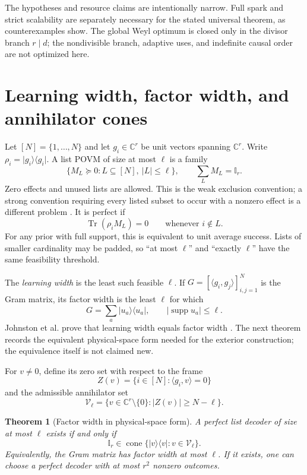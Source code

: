\documentclass[11pt,a4paper]{article}
\newtheorem{theorem}{Theorem}[section]
\newcommand{\C}{\mathbb{C}}
\newcommand{\I}{\mathbb{I}}
\newcommand{\Tr}{\operatorname{Tr}}
\newcommand{\supp}{\operatorname{supp}}
\newcommand{\cone}{\operatorname{cone}}
\newcommand{\ket}[1]{\lvert #1\rangle}
\newcommand{\bra}[1]{\langle #1\rvert}
\newcommand{\proj}[1]{\ket{#1}\!\bra{#1}}
\begin{document}
The hypotheses and resource claims are intentionally narrow.  Full spark and
strict scalability are separately necessary for the stated universal theorem, as
counterexamples show.  The global Weyl optimum is closed only in the divisor
branch $r\mid d$; the nondivisible branch, adaptive uses, and indefinite
causal order are not optimized here.

\section{Learning width, factor width, and annihilator cones}

Let $[N]=\{1,\ldots,N\}$ and let $g_i\in\C^r$ be unit vectors spanning
$\C^r$.  Write $\rho_i=\proj{g_i}$.  A list POVM of size at most $\ell$ is a
family
\[
  \{M_L\succeq0:L\subseteq[N],\ |L|\le\ell\},\qquad
  \sum_L M_L=\I_r.
\]
Zero effects and unused lists are allowed.  This is the weak exclusion
convention; a strong convention requiring every listed subset to occur with a
nonzero effect is a different problem \cite{StrattonHsiehSkrzypczyk2024}.
It is perfect if
\begin{equation}\label{eq:perfect}
  \Tr(\rho_iM_L)=0\qquad\text{whenever }i\notin L.
\end{equation}
For any prior with full support, this is equivalent to unit average success.
Lists of smaller cardinality may be padded, so ``at most $\ell$'' and
``exactly $\ell$'' have the same feasibility threshold.

The \emph{learning width} is the least such feasible $\ell$.  If
$G=[\langle g_i,g_j\rangle]_{i,j=1}^N$ is the Gram matrix, its factor width is
the least $\ell$ for which
\begin{equation}\label{eq:factorwidth}
  G=\sum_a\proj{u_a},
  \qquad |\supp u_a|\le\ell.
\end{equation}
Johnston et al. prove that learning width equals factor width
\cite{JohnstonLovitzRussoSikora2025}.  The next theorem records the equivalent
physical-space form needed for the exterior construction; the equivalence
itself is not claimed new.

For $v\ne0$, define its zero set with respect to the frame
\[
  Z(v)=\{i\in[N]:\langle g_i,v\rangle=0\}
\]
and the admissible annihilator set
\[
  \mathcal V_\ell=\{v\in\C^r\setminus\{0\}:|Z(v)|\ge N-\ell\}.
\]

\begin{theorem}[Factor width in physical-space form]\label{thm:cone}
A perfect list decoder of size at most $\ell$ exists if and only if
\begin{equation}\label{eq:cone}
  \I_r\in\cone\{\proj v:v\in\mathcal V_\ell\}.
\end{equation}
Equivalently, the Gram matrix has factor width at most $\ell$.
If it exists, one can choose a perfect decoder with at most $r^2$ nonzero
outcomes.
\end{theorem}
\end{document}
